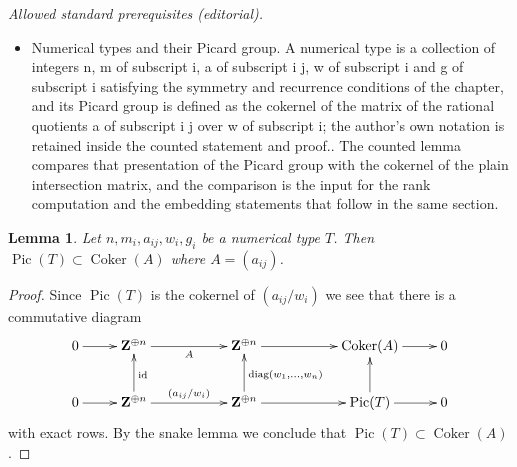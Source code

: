 \documentclass[10pt,a4paper]{amsart}
\theoremstyle{plain}
\newtheorem{lemma}[subsection]{Lemma}
\theoremstyle{definition}
\theoremstyle{remark}
\numberwithin{equation}{subsection}
\def\Coker{\mathop{\mathrm{Coker}}}
\def\Pic{\mathop{\mathrm{Pic}}\nolimits}
\begin{document}
\noindent\textit{Allowed standard prerequisites (editorial).}\begin{itemize}
\item Numerical types and their Picard group. A numerical type is a collection of integers n, m of subscript i, a of subscript i j, w of subscript i and g of subscript i satisfying the symmetry and recurrence conditions of the chapter, and its Picard group is defined as the cokernel of the matrix of the rational quotients a of subscript i j over w of subscript i; the author's own notation is retained inside the counted statement and proof.. The counted lemma compares that presentation of the Picard group with the cokernel of the plain intersection matrix, and the comparison is the input for the rank computation and the embedding statements that follow in the same section.
\end{itemize}\medskip
\begin{lemma}
\label{lemma-picard-T-and-A}
Let $n, m_i, a_{ij}, w_i, g_i$ be a numerical type $T$.
Then $\Pic(T) \subset \Coker(A)$ where $A = (a_{ij})$.
\end{lemma}

\begin{proof}
Since $\Pic(T)$ is the cokernel of $(a_{ij}/w_i)$
we see that there is a commutative diagram
$$
\xymatrix{
0 \ar[r] &
\mathbf{Z}^{\oplus n} \ar[rr]_A & &
\mathbf{Z}^{\oplus n} \ar[rr] & &
\Coker(A) \ar[r] & 0 \\
0 \ar[r] &
\mathbf{Z}^{\oplus n} \ar[rr]^{(a_{ij}/w_i)} \ar[u]_{\text{id}} & &
\mathbf{Z}^{\oplus n} \ar[rr] \ar[u]_{\text{diag}(w_1, \ldots, w_n)} & &
\Pic(T) \ar[r] \ar[u] & 0
}
$$
with exact rows. By the snake lemma we conclude that
$\Pic(T) \subset \Coker(A)$.
\end{proof}
\end{document}
